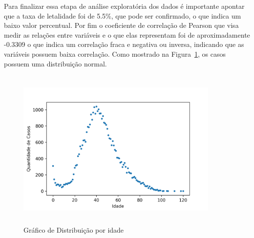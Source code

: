Para finalizar essa etapa de análise exploratória dos dados é importante apontar que a taxa de letalidade foi de 5.5\%, que pode ser confirmado, o que indica um baixo valor percentual. Por fim o coeficiente de correlação de Pearson que visa medir as relações entre variáveis e o que elas representam foi de aproximadamente -0.3309 o que indica um correlação fraca e negativa ou inversa, indicando que as variáveis possuem baixa correlação. Como mostrado na Figura~\ref{fig:normal}, os casos possuem uma distribuição normal.

\begin{figure}[!ht]
\centering
    \includegraphics[width=10cm, height=8cm]{img/distribuicaoPorIdade.png}
    \caption{Gráfico de Distribuição por idade}
    \label{fig:normal} %
\end{figure}
